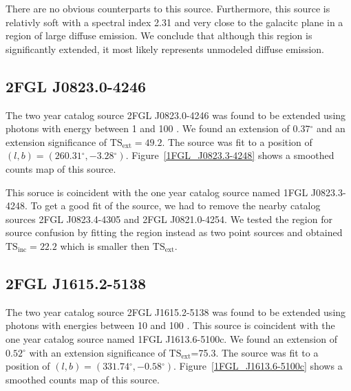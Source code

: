 \documentclass[12pt,preprint]{aastex}
\newcommand{\gev}{\text{GeV}\xspace}
\newcommand{\tsext}{{\ensuremath{\text{TS}_\text{ext}}}\xspace}
\newcommand{\tsinc}{\ensuremath{\text{TS}_\text{inc}}\xspace}
\renewcommand{\deg}{\ensuremath{^\circ}\xspace}
\begin{document}
There are no obvious counterparts to this source. Furthermore, this
source is relativly soft with a spectral index 2.31 and
very close to the galacitc plane in a region of large diffuse emission.
We conclude that although this region is significantly extended, it most
likely represents unmodeled diffuse emission.


\subsection{2FGL J0823.0-4246}


The two year catalog source 2FGL J0823.0-4246 was found to be
extended using photons with energy between 1 \gev and 100 \gev.
We found an extension of $0.37\deg$ and an extension
significance of $\tsext=49.2$.  The source was fit to a position of
$(l,b)=(260.31\deg,-3.28\deg)$.  Figure~\ref{1FGL_J0823.3-4248} shows
a smoothed counts map of this source.

This soruce is coincident with the one year catalog source named 1FGL J0823.3-4248.
To get a good fit of the source, we had to remove the nearby catalog
sources 2FGL J0823.4-4305 and 2FGL J0821.0-4254.  We tested the 
region for source confusion by fitting the region instead as two point
sources and obtained $\tsinc=22.2$ which is smaller then \tsext.


\subsection{2FGL J1615.2-5138}


The two year catalog source 2FGL J1615.2-5138 was found to be
extended using photons with energies between 10 \gev and 100 \gev.
This source is coincident with the one year catalog source named 1FGL
J1613.6-5100c.  We found an extension of $0.52\deg$ with an extension
significance of \tsext=75.3.  The source was fit to a position of
$(l,b)=(331.74\deg,-0.58\deg)$.  Figure~\ref{1FGL_J1613.6-5100c} shows
a smoothed counts map of this source.
\end{document}
